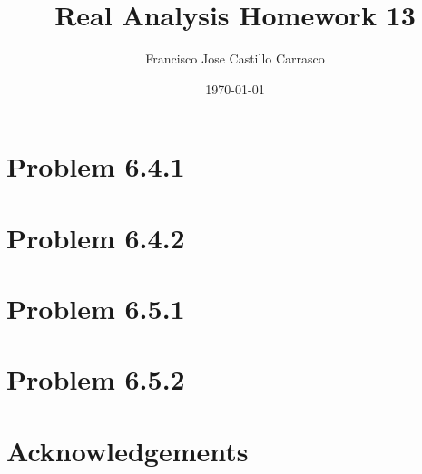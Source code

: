 




\title{Real Analysis Homework 13}
\author{Francisco Jose Castillo Carrasco}
\date{\today}
\maketitle




\section{Problem 6.4.1}


\section{Problem 6.4.2}


\newpage
\section{Problem 6.5.1}


\newpage
\section{Problem 6.5.2}


\section*{Acknowledgements}







